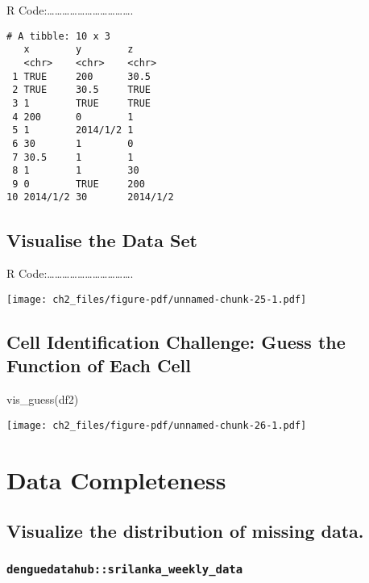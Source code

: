 \documentclass[
  letterpaper,
  DIV=11,
  numbers=noendperiod]{scrreprt}
\newenvironment{Shaded}{\begin{snugshade}}{\end{snugshade}}
\newcommand{\FunctionTok}[1]{\textcolor[rgb]{0.28,0.35,0.67}{#1}}
\newcommand{\NormalTok}[1]{\textcolor[rgb]{0.00,0.23,0.31}{#1}}
\begin{document}
R
Code:\ldots\ldots\ldots\ldots\ldots\ldots\ldots\ldots\ldots\ldots\ldots.

\begin{verbatim}
# A tibble: 10 x 3
   x        y        z       
   <chr>    <chr>    <chr>   
 1 TRUE     200      30.5    
 2 TRUE     30.5     TRUE    
 3 1        TRUE     TRUE    
 4 200      0        1       
 5 1        2014/1/2 1       
 6 30       1        0       
 7 30.5     1        1       
 8 1        1        30      
 9 0        TRUE     200     
10 2014/1/2 30       2014/1/2
\end{verbatim}

\subsection{Visualise the Data Set}\label{visualise-the-data-set}

R
Code:\ldots\ldots\ldots\ldots\ldots\ldots\ldots\ldots\ldots\ldots\ldots.

\texttt{[image: ch2\_files/figure-pdf/unnamed-chunk-25-1.pdf]}

\subsection{Cell Identification Challenge: Guess the Function of Each
Cell}\label{cell-identification-challenge-guess-the-function-of-each-cell}

\begin{Shaded}
\begin{Highlighting}[]
\FunctionTok{vis\_guess}\NormalTok{(df2)}
\end{Highlighting}
\end{Shaded}

\texttt{[image: ch2\_files/figure-pdf/unnamed-chunk-26-1.pdf]}

\section{Data Completeness}\label{data-completeness}

\subsection{Visualize the distribution of missing
data.}\label{visualize-the-distribution-of-missing-data.}

\subsubsection{\texorpdfstring{\texttt{denguedatahub::srilanka\_weekly\_data}}{denguedatahub::srilanka\_weekly\_data}}\label{denguedatahubsrilanka_weekly_data-3}
\end{document}
